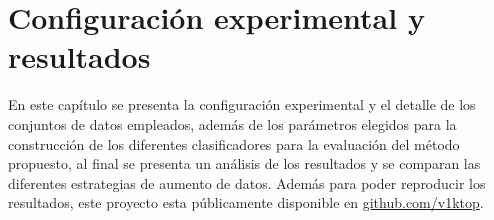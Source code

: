 \chapter{Configuración experimental y resultados}
En este capítulo se presenta la configuración experimental y el detalle de los conjuntos de datos empleados, además de los parámetros elegidos para la construcción de los diferentes clasificadores para la evaluación del método propuesto, al final se presenta un análisis de los resultados y se comparan las diferentes estrategias de aumento de datos. Además para poder reproducir los resultados, este proyecto esta públicamente disponible en \href{https://github.com/v1ktop/data_augmentation_for_author_profiling}{github.com/v1ktop}.








